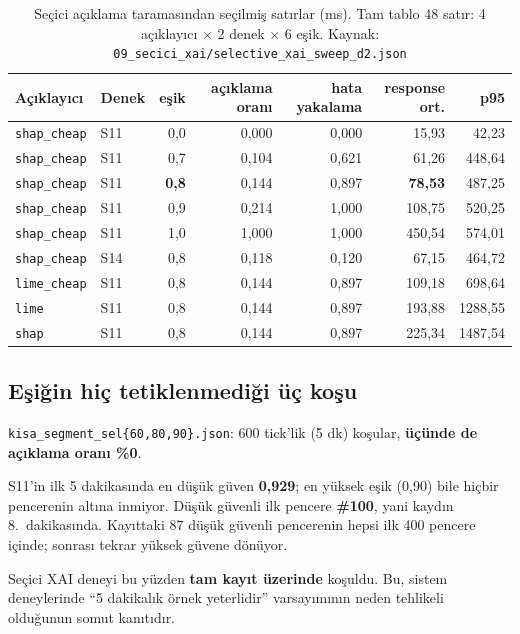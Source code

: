 \documentclass[11pt,a4paper]{report}
\newcommand{\kod}[1]{\texttt{\small #1}}
\newcommand{\dosya}[1]{\texttt{\footnotesize #1}}
\begin{document}
\begin{table}[H]
\centering\footnotesize
\begin{tabular}{@{}llrrrrr@{}}
\toprule
\textbf{Açıklayıcı} & \textbf{Denek} & \textbf{eşik} & \textbf{açıklama oranı} & \textbf{hata yakalama} & \textbf{response ort.} & \textbf{p95} \\
\midrule
\kod{shap\_cheap} & S11 & 0{,}0 & 0{,}000 & 0{,}000 & 15{,}93 & 42{,}23 \\
\kod{shap\_cheap} & S11 & 0{,}7 & 0{,}104 & 0{,}621 & 61{,}26 & 448{,}64 \\
\kod{shap\_cheap} & S11 & \textbf{0{,}8} & 0{,}144 & 0{,}897 & \textbf{78{,}53} & 487{,}25 \\
\kod{shap\_cheap} & S11 & 0{,}9 & 0{,}214 & 1{,}000 & 108{,}75 & 520{,}25 \\
\kod{shap\_cheap} & S11 & 1{,}0 & 1{,}000 & 1{,}000 & 450{,}54 & 574{,}01 \\
\midrule
\kod{shap\_cheap} & S14 & 0{,}8 & 0{,}118 & 0{,}120 & 67{,}15 & 464{,}72 \\
\kod{lime\_cheap} & S11 & 0{,}8 & 0{,}144 & 0{,}897 & 109{,}18 & 698{,}64 \\
\kod{lime}        & S11 & 0{,}8 & 0{,}144 & 0{,}897 & 193{,}88 & 1288{,}55 \\
\kod{shap}        & S11 & 0{,}8 & 0{,}144 & 0{,}897 & 225{,}34 & 1487{,}54 \\
\bottomrule
\end{tabular}
\caption{Seçici açıklama taramasından seçilmiş satırlar (ms). Tam tablo 48
satır: 4 açıklayıcı $\times$ 2 denek $\times$ 6 eşik.
Kaynak: \dosya{09\_secici\_xai/selective\_xai\_sweep\_d2.json}}
\end{table}

\subsection{Eşiğin hiç tetiklenmediği üç koşu}

\dosya{kisa\_segment\_sel\{60,80,90\}.json}: 600 tick'lik (5 dk) koşular,
\textbf{üçünde de açıklama oranı \%0}.

\begin{bulgu}
S11'in ilk 5 dakikasında en düşük güven \textbf{0{,}929}; en yüksek eşik
(0{,}90) bile hiçbir pencerenin altına inmiyor. Düşük güvenli ilk pencere
\textbf{\#100}, yani kaydın 8.\ dakikasında. Kayıttaki 87 düşük güvenli
pencerenin hepsi ilk 400 pencere içinde; sonrası tekrar yüksek güvene dönüyor.

Seçici XAI deneyi bu yüzden \textbf{tam kayıt üzerinde} koşuldu. Bu, sistem
deneylerinde ``5 dakikalık örnek yeterlidir'' varsayımının neden tehlikeli
olduğunun somut kanıtıdır.
\end{bulgu}
\end{document}
